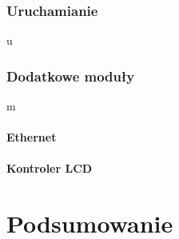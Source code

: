 \documentclass[a4paper,12pt]{book}
\begin{document}
			\subsection{Uruchamianie}
				u
			\subsection{Dodatkowe moduły}
				\label{sec:linux_modules}
				m
				\subsubsection{Ethernet}
				\subsubsection{Kontroler LCD}
		
	\chapter{Podsumowanie}

	
	
	
	
	
	\appendix
	
\end{document}
